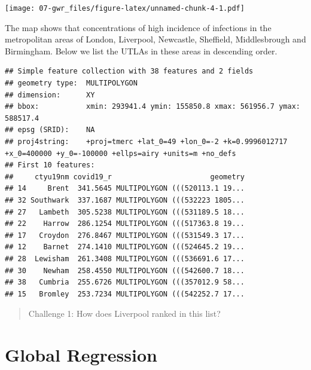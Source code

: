 \documentclass[]{book}
\newenvironment{Shaded}{\begin{snugshade}}{\end{snugshade}}
\newcommand{\KeywordTok}[1]{\textcolor[rgb]{0.13,0.29,0.53}{\textbf{#1}}}
\newcommand{\DecValTok}[1]{\textcolor[rgb]{0.00,0.00,0.81}{#1}}
\newcommand{\StringTok}[1]{\textcolor[rgb]{0.31,0.60,0.02}{#1}}
\newcommand{\OperatorTok}[1]{\textcolor[rgb]{0.81,0.36,0.00}{\textbf{#1}}}
\newcommand{\NormalTok}[1]{#1}
\begin{document}
\texttt{[image: 07-gwr\_files/figure-latex/unnamed-chunk-4-1.pdf]}

The map shows that concentrations of high incidence of infections in the
metropolitan areas of London, Liverpool, Newcastle, Sheffield,
Middlesbrough and Birmingham. Below we list the UTLAs in these areas in
descending order.

\begin{Shaded}
\end{Shaded}

\begin{verbatim}
## Simple feature collection with 38 features and 2 fields
## geometry type:  MULTIPOLYGON
## dimension:      XY
## bbox:           xmin: 293941.4 ymin: 155850.8 xmax: 561956.7 ymax: 588517.4
## epsg (SRID):    NA
## proj4string:    +proj=tmerc +lat_0=49 +lon_0=-2 +k=0.9996012717 +x_0=400000 +y_0=-100000 +ellps=airy +units=m +no_defs
## First 10 features:
##     ctyu19nm covid19_r                       geometry
## 14     Brent  341.5645 MULTIPOLYGON (((520113.1 19...
## 32 Southwark  337.1687 MULTIPOLYGON (((532223 1805...
## 27   Lambeth  305.5238 MULTIPOLYGON (((531189.5 18...
## 22    Harrow  286.1254 MULTIPOLYGON (((517363.8 19...
## 17   Croydon  276.8467 MULTIPOLYGON (((531549.3 17...
## 12    Barnet  274.1410 MULTIPOLYGON (((524645.2 19...
## 28  Lewisham  261.3408 MULTIPOLYGON (((536691.6 17...
## 30    Newham  258.4550 MULTIPOLYGON (((542600.7 18...
## 38   Cumbria  255.6726 MULTIPOLYGON (((357012.9 58...
## 15   Bromley  253.7234 MULTIPOLYGON (((542252.7 17...
\end{verbatim}

\begin{quote}
Challenge 1: How does Liverpool ranked in this list?
\end{quote}

\section{Global Regression}\label{global-regression}
\end{document}
